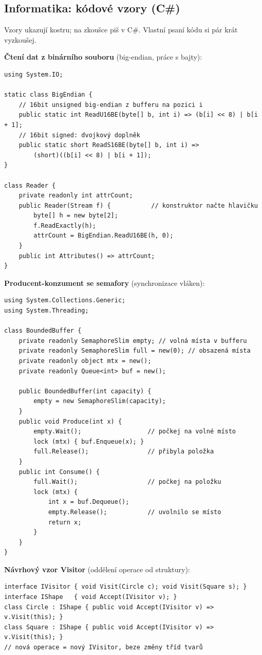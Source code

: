 \subsection{Informatika: kódové vzory (C\#)}
{\small Vzory ukazují kostru; na zkoušce piš v C\#. Vlastní psaní kódu si pár krát vyzkoušej.}

\noindent\textbf{Čtení dat z binárního souboru} (big-endian, práce s bajty):
\begin{verbatim}
using System.IO;

static class BigEndian {
    // 16bit unsigned big-endian z bufferu na pozici i
    public static int ReadU16BE(byte[] b, int i) => (b[i] << 8) | b[i + 1];
    // 16bit signed: dvojkový doplněk
    public static short ReadS16BE(byte[] b, int i) =>
        (short)((b[i] << 8) | b[i + 1]);
}

class Reader {
    private readonly int attrCount;
    public Reader(Stream f) {           // konstruktor načte hlavičku
        byte[] h = new byte[2];
        f.ReadExactly(h);
        attrCount = BigEndian.ReadU16BE(h, 0);
    }
    public int Attributes() => attrCount;
}
\end{verbatim}

\noindent\textbf{Producent-konzument se semafory} (synchronizace vláken):
\begin{verbatim}
using System.Collections.Generic;
using System.Threading;

class BoundedBuffer {
    private readonly SemaphoreSlim empty; // volná místa v bufferu
    private readonly SemaphoreSlim full = new(0); // obsazená místa
    private readonly object mtx = new();
    private readonly Queue<int> buf = new();

    public BoundedBuffer(int capacity) {
        empty = new SemaphoreSlim(capacity);
    }
    public void Produce(int x) {
        empty.Wait();                  // počkej na volné místo
        lock (mtx) { buf.Enqueue(x); }
        full.Release();                // přibyla položka
    }
    public int Consume() {
        full.Wait();                   // počkej na položku
        lock (mtx) {
            int x = buf.Dequeue();
            empty.Release();           // uvolnilo se místo
            return x;
        }
    }
}
\end{verbatim}

\noindent\textbf{Návrhový vzor Visitor} (oddělení operace od struktury):
\begin{verbatim}
interface IVisitor { void Visit(Circle c); void Visit(Square s); }
interface IShape   { void Accept(IVisitor v); }
class Circle : IShape { public void Accept(IVisitor v) => v.Visit(this); }
class Square : IShape { public void Accept(IVisitor v) => v.Visit(this); }
// nová operace = nový IVisitor, beze změny tříd tvarů
\end{verbatim}
